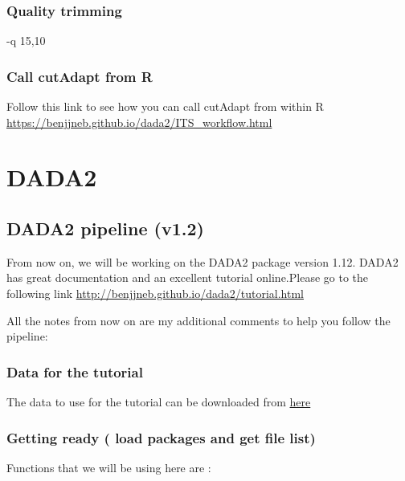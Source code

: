 \documentclass[
]{book}
\begin{document}
\hypertarget{quality-trimming}{%
\subsection{Quality trimming}\label{quality-trimming}}

-q 15,10

\hypertarget{call-cutadapt-from-r}{%
\subsection{Call cutAdapt from R}\label{call-cutadapt-from-r}}

Follow this link to see how you can call cutAdapt from within R
\url{https://benjjneb.github.io/dada2/ITS_workflow.html}

\hypertarget{dada2}{%
\chapter{DADA2}\label{dada2}}

\hypertarget{dada2-pipeline-v1.2}{%
\section{DADA2 pipeline (v1.2)}\label{dada2-pipeline-v1.2}}

From now on, we will be working on the DADA2 package version 1.12. DADA2 has great documentation and an excellent tutorial online.Please go to the following link \url{http://benjjneb.github.io/dada2/tutorial.html}

All the notes from now on are my additional comments to help you follow the pipeline:

\hypertarget{data-for-the-tutorial}{%
\subsection{Data for the tutorial}\label{data-for-the-tutorial}}

The data to use for the tutorial can be downloaded from \href{MiSeqSOPData.zip}{here}

\hypertarget{getting-ready-load-packages-and-get-file-list}{%
\subsection{Getting ready ( load packages and get file list)}\label{getting-ready-load-packages-and-get-file-list}}

Functions that we will be using here are :
\end{document}
